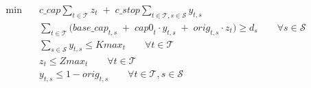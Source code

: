 \begin{align}
  \min\quad & \mathit{c\_cap} \sum_{t \in \mathcal{T}} z_{t} \;+\; \mathit{c\_stop} \sum_{t \in \mathcal{T}, s \in \mathcal{S}} y_{t,s} \tag{total\_cost} \\
  & \sum_{t \in \mathcal{T}} \bigl( \mathit{base\_cap}_{t,s} \;+\; \mathit{cap0}_{t} \cdot y_{t,s} \;+\; \mathit{orig}_{t,s} \cdot z_{t} \bigr) \ge d_{s} \qquad \forall s \in \mathcal{S} \tag{demand\_sat} \\
  & \sum_{s \in \mathcal{S}} y_{t,s} \le Kmax_{t} \qquad \forall t \in \mathcal{T} \tag{add\_stop\_limit} \\
  & z_{t} \le Zmax_{t} \qquad \forall t \in \mathcal{T} \tag{cap\_inc\_limit} \\
  & y_{t,s} \le 1 - \mathit{orig}_{t,s} \qquad \forall t \in \mathcal{T}, s \in \mathcal{S} \tag{no\_dup\_stop} \\
\end{align}